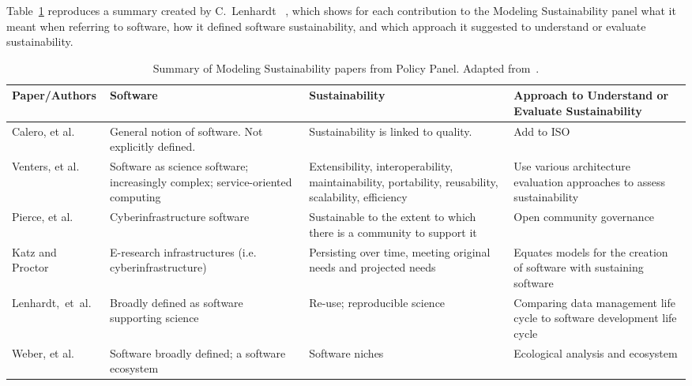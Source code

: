 \documentclass[11pt, oneside]{amsart}
\begin{document}
Table~\ref{tab:defining-sustainability} reproduces a summary created
by C.~Lenhardt ~\cite{lenhardt-wssspe1-panel}, which shows for each contribution to the
Modeling Sustainability panel what it meant when referring to
software, how it defined software sustainability, and which
approach it suggested to understand or evaluate sustainability.
\begin{table}[t]
  \begin{scriptsize}
    \begin{center}
      \caption{Summary of Modeling Sustainability papers from Policy Panel.  Adapted from~\cite{lenhardt-wssspe1-panel}.}
      \label{tab:defining-sustainability}
      \begin{tabular}{|p{2.3cm}|p{3.6cm}|p{4.4cm}|p{4.8cm}|}
                \hline
{\bf Paper/Authors}
& {\bf Software}
& {\bf Sustainability}
& {\bf Approach to Understand or Evaluate Sustainability} \\
                \hline
Calero, et al.~\cite{Calero_WSSSPE}
& General notion of software. Not explicitly defined.
& Sustainability is linked to quality.
& Add to ISO \\
                \hline
Venters, et al.~\cite{Venters_WSSSPE}
& Software as science software; increasingly complex; service-oriented computing
& Extensibility, interoperability, maintainability, portability, reusability, scalability, efficiency
& Use various architecture evaluation approaches to assess sustainability \\
                \hline
Pierce, et al.~\cite{Pierce_WSSSPE}
& Cyberinfrastructure software
& Sustainable to the extent to which there is a community to support it
& Open community governance \\
                \hline
Katz and Proctor~\cite{Katz_WSSSPE}
& E-research infrastructures (i.e. cyberinfrastructure)
& Persisting over time, meeting original needs and projected needs
& Equates models for the creation of software with sustaining software \\
                \hline
Lenhardt,~et~al.~\cite{Lenhardt_WSSSPE}
& Broadly defined as software supporting science
& Re-use; reproducible science
& Comparing data management life cycle to software development life cycle \\
                \hline
Weber, et al.~\cite{Weber_WSSSPE}
& Software broadly defined; a software ecosystem
& Software niches
& Ecological analysis and ecosystem \\
                \hline
     \end{tabular}
    \end{center}
  \end{scriptsize}
\end{table}
\end{document}
